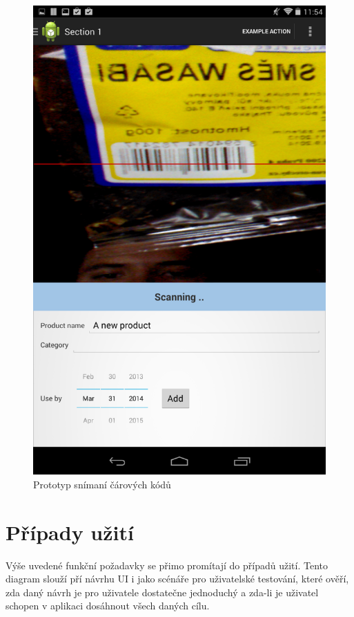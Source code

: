 \documentclass[thesis=B,czech]{FITthesis}[2013/10/20]
\begin{document}
\begin{figure}[H]
  \centering
  \includegraphics[scale=0.3]{screenshots/scan_prototype.png}
  \caption{Prototyp snímaní čárových kódů}
  \label{fig:ScanPrototype}
\end{figure}

\clearpage

\section{Případy užití}

Výše uvedené funkční požadavky se přimo promítají do případů užití. Tento diagram slouží pří návrhu UI i jako scénáře pro uživatelské testování, které ověří, zda daný návrh je pro uživatele dostatečne jednoduchý a zda-li je uživatel schopen v aplikaci dosáhnout všech daných cílu.
\end{document}
